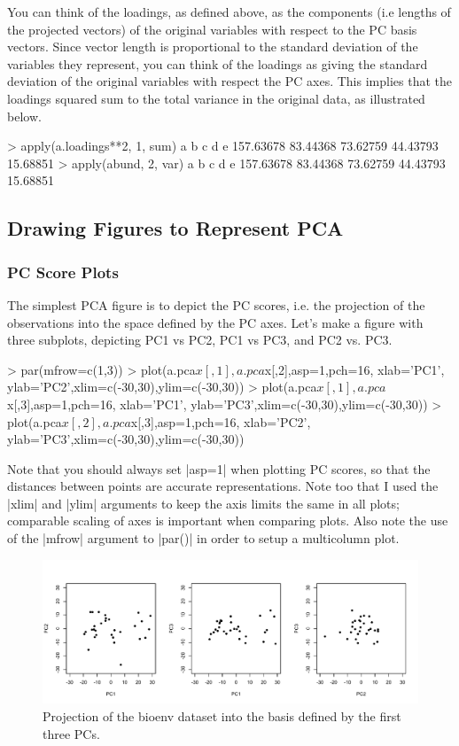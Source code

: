 You can think of the loadings, as defined above, as the components (i.e lengths of the projected vectors) of the original variables with respect to the PC basis vectors.  Since vector length is proportional to the standard deviation of the variables they represent, you can think of the loadings as giving the standard deviation of the original variables with respect the PC axes. This implies that the loadings squared sum to the total variance in the original data, as illustrated below.
\begin{R}
> apply(a.loadings**2, 1, sum)
        a         b         c         d         e
157.63678  83.44368  73.62759  44.43793  15.68851
> apply(abund, 2, var)
        a         b         c         d         e
157.63678  83.44368  73.62759  44.43793  15.68851
\end{R}

\subsection{Drawing Figures to Represent PCA}

\subsubsection{PC Score Plots}

The simplest PCA figure is to depict the PC scores, i.e. the projection of the observations into the space defined by the PC axes. Let's make a figure with three subplots, depicting PC1 vs PC2, PC1 vs PC3, and PC2 vs. PC3.
\begin{R}
> par(mfrow=c(1,3))
> plot(a.pca$x[,1], a.pca$x[,2],asp=1,pch=16, xlab='PC1', ylab='PC2',xlim=c(-30,30),ylim=c(-30,30))
> plot(a.pca$x[,1], a.pca$x[,3],asp=1,pch=16, xlab='PC1', ylab='PC3',xlim=c(-30,30),ylim=c(-30,30))
> plot(a.pca$x[,2], a.pca$x[,3],asp=1,pch=16, xlab='PC2', ylab='PC3',xlim=c(-30,30),ylim=c(-30,30))
\end{R}
Note that you should always set |asp=1| when plotting PC scores, so that the distances between points are accurate representations. Note too that I used the |xlim| and |ylim| arguments to keep the axis limits the same in all plots; comparable scaling of axes is important when comparing plots. Also note the use of the |mfrow| argument to |par()| in order to setup a multicolumn plot.

\begin{figure}[htbp]
\centering
\includegraphics[width=0.95\columnwidth]{./figures/hands-on5/bioenv-scores.pdf}
\caption{Projection of the bioenv dataset into the basis defined by the first three PCs.}\label{fig:bioenvscore}
\end{figure}


